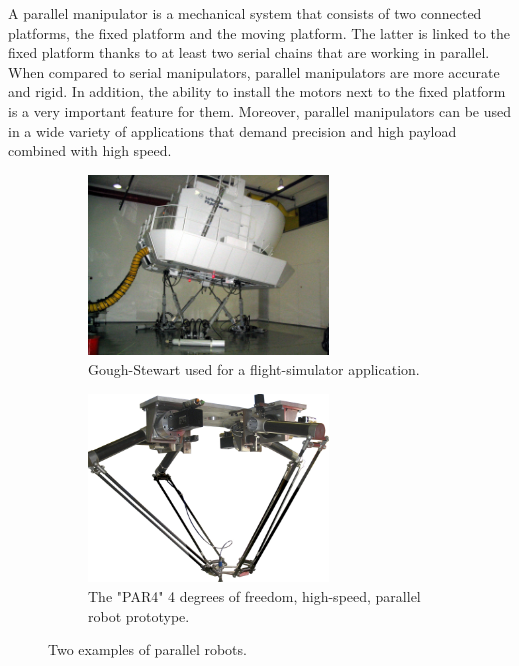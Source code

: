 \documentclass{thesisreport}
\begin{document}
A parallel manipulator is a mechanical system that consists of two connected platforms, the fixed platform and the moving platform. The latter is linked to the fixed platform thanks to at least two serial chains that are working in parallel. When compared to serial manipulators, parallel manipulators are more accurate and rigid. In addition, the ability to install the motors next to the fixed platform is a very important feature for them. Moreover, parallel manipulators can be used in a wide variety of applications that demand precision and high payload combined with high speed.\cite{Parallel_Manipulators}

\begin{figure}[h]
     \centering
     \begin{subfigure}[h]{0.45\textwidth}
         \centering
         \includegraphics[width=0.7\textwidth]{Images/Introduction/GS}
    \caption[Caption for LOF]{Gough-Stewart used for a flight-simulator application.\protect\footnotemark}
         \label{GS}
     \end{subfigure}
     \hfill
     \begin{subfigure}[h]{0.45\textwidth}
         \centering
         \includegraphics[width=0.7\textwidth]{Images/Introduction/PAR4}
         \caption[Caption for LOF]{The "PAR4" 4 degrees of freedom, high-speed, parallel robot prototype.\protect\footnotemark}
         \label{PAR4}
     \end{subfigure}
        \caption{Two examples of parallel robots.}
        \label{fig:three graphs}
\end{figure}
\end{document}
